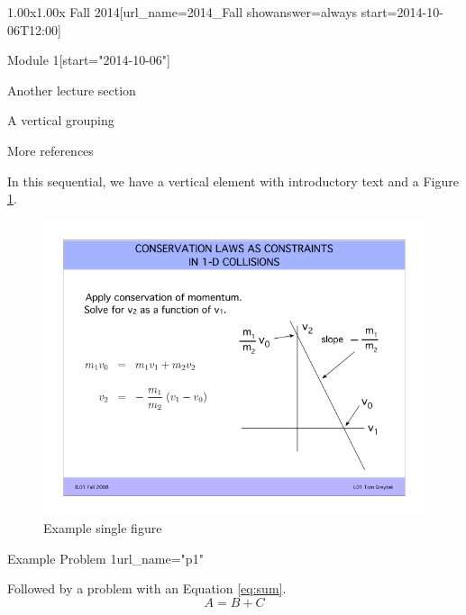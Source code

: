 \documentclass[12pt]{article}
\begin{document}
\begin{edXcourse}{1.00x}{1.00x Fall 2014}[url_name=2014_Fall showanswer=always start=2014-10-06T12:00]
\begin{edXchapter}{Module 1}[start="2014-10-06"]
\begin{edXsequential}{Another lecture section}
\begin{edXvertical}{A vertical grouping}

\begin{edXtext}{More references}

In this sequential, we have a vertical element with introductory text and a Figure \ref{fig:examplefig}.
\begin{figure}
  \begin{center}
    \includegraphics{example-image.png}
    \caption{Example single figure}
    \label{fig:examplefig}
  \end{center}
\end{figure}

\end{edXtext}

\begin{edXproblem}{Example Problem 1}{url_name="p1"}

Followed by a problem with an Equation \ref{eq:sum}.
\begin{equation}
  \boxed{A = B + C}
  \label{eq:sum}
\end{equation}

\end{edXproblem}

\end{edXvertical}

\end{edXsequential}

\end{edXchapter}

\end{edXcourse}
\end{document}
